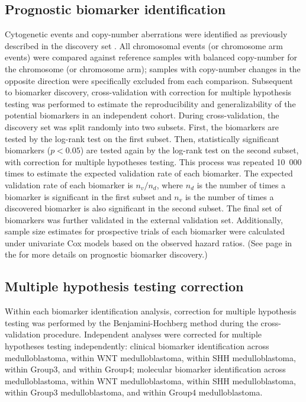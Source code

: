 \subsection{Prognostic biomarker identification}

Cytogenetic events and copy-number aberrations were identified as previously described in the discovery set . All chromosomal events (or chromosome arm events) were compared against reference samples with balanced copy-number for the chromosome (or chromosome arm); samples with copy-number changes in the opposite direction were specifically excluded from each comparison. Subsequent to biomarker discovery, cross-validation with correction for multiple hypothesis testing was performed to estimate the reproducibility and generalizability of the potential biomarkers in an independent cohort. During cross-validation, the discovery set was split randomly into two subsets. First, the biomarkers are tested by the log-rank test on the first subset. Then, statistically significant biomarkers ($p < 0.05$) are tested again by the log-rank test on the second subset, with correction for multiple hypotheses testing. This process was repeated 10~000 times to estimate the expected validation rate of each biomarker. The expected validation rate of each biomarker is $n_v / n_d$, where $n_d$ is the number of times a biomarker is significant in the first subset and $n_v$ is the number of times a discovered biomarker is also significant in the second subset. The final set of biomarkers was further validated in the external validation set. Additionally, sample size estimates for prospective trials of each biomarker were calculated under univariate Cox models based on the observed hazard ratios. (See page \pageref{sec:prognostication} in the  for more details on prognostic biomarker discovery.)

\subsection{Multiple hypothesis testing correction}

Within each biomarker identification analysis, correction for multiple hypothesis testing was performed by the Benjamini-Hochberg method during the cross-validation procedure. Independent analyses were corrected for multiple hypotheses testing independently: clinical biomarker identification across medulloblastoma, within WNT medulloblastoma, within SHH medulloblastoma, within Group3, and within Group4; molecular biomarker identification across medulloblastoma, within WNT medulloblastoma, within SHH medulloblastoma, within Group3 medulloblastoma, and within Group4 medulloblastoma.

